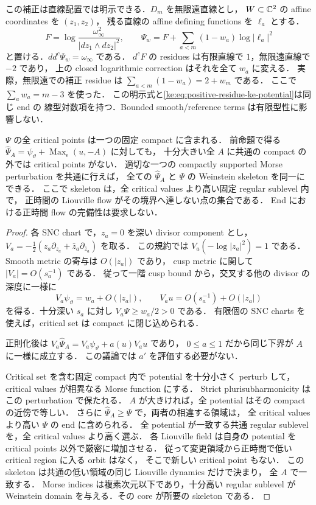 この補正は直線配置では明示できる．$D_m$ を無限遠直線とし，
$W\subset\mathbb C^2$ の affine coordinates を $(z_1,z_2)$，
残る直線の affine defining functions を $\ell_a$ とする．
\[
 F=\log\frac{\omega_\infty^2}{|dz_1\wedge dz_2|^2},\qquad
 \Psi_w=F+\sum_{a<m}(1-w_a)\log|\ell_a|^2
\]
と置ける．$dd^c\Psi_w=\omega_\infty$ である．
$d^cF$ の residues は有限直線で $1$，無限遠直線で $-2$ であり，
上の closed logarithmic correction はそれを全て $w_a$ に変える．
実際，無限遠での補正 residue は
$\sum_{a<m}(1-w_a)=2+w_m$ である．
ここで $\sum_aw_a=m-3$ を使った．
この明示式と\eqref{ke:eq:positive-residue-ke-potential}は同じ end の
線型対数項を持つ．Bounded smooth/reference terms は有限型性に影響しない．

\begin{lemma}[正則化に一様な有限型性]
\label{ke:positive-residue-finite-type}
$\Psi$ の全 critical points は一つの固定 compact に含まれる．
前命題で得る
$\widehat\Psi_A=\psi_\vartheta+\operatorname{Max}_\epsilon(u,-A)$ に対しても，
十分大きい全 $A$ に共通の compact の外では critical points がない．
適切な一つの compactly supported Morse perturbation を共通に行えば，
全ての $\widehat\Psi_A$ と $\Psi$ の Weinstein skeleton を同一にできる．
ここで skeleton は，全 critical values より高い固定 regular sublevel 内で，
正時間の Liouville flow がその境界へ達しない点の集合である．
End における正時間 flow の完備性は要求しない．
\end{lemma}

\begin{proof}
各 SNC chart で，$z_a=0$ を深い divisor component とし，
$V_a=-\tfrac12(z_a\partial_{z_a}+\bar z_a\partial_{\bar z_a})$ を取る．
この規約では $V_a(-\log|z_a|^2)=1$ である．
Smooth metric の寄与は $O(|z_a|)$ であり，
cusp metric に関して $|V_a|=O(s_a^{-1})$ である．
従って一階 cusp bound から，交叉する他の divisor の深度に一様に
\[
 V_a\psi_\vartheta=w_a+O(|z_a|),\qquad
 V_a u=O(s_a^{-1})+O(|z_a|)
\]
を得る．十分深い $s_a$ に対し $V_a\Psi\ge w_a/2>0$ である．
有限個の SNC charts を使えば，critical set は compact に閉じ込められる．

正則化後は
$V_a\widehat\Psi_A=V_a\psi_\vartheta+a(u)V_au$ であり，
$0\le a\le1$ だから同じ下界が $A$ に一様に成立する．
この議論では $a'$ を評価する必要がない．

Critical set を含む固定 compact 内で potential を十分小さく perturb して，
critical values が相異なる Morse function にする．
Strict plurisubharmonicity はこの perturbation で保たれる．
$A$ が大きければ，全 potential はその compact の近傍で等しい．
さらに $\widehat\Psi_A\ge\Psi$ で，両者の相違する領域は，
全 critical values より高い $\Psi$ の end に含められる．
全 potential が一致する共通 regular sublevel を，全 critical values より高く選ぶ．
各 Liouville field は自身の potential を critical points 以外で厳密に増加させる．
従って変更領域から正時間で低い critical region に入る orbit はなく，
そこで新しい critical point もない．
この skeleton は共通の低い領域の同じ Liouville dynamics だけで決まり，
全 $A$ で一致する．
Morse indices は複素次元以下であり，十分高い regular sublevel が
Weinstein domain を与える．その core が所要の skeleton である．
\end{proof}

